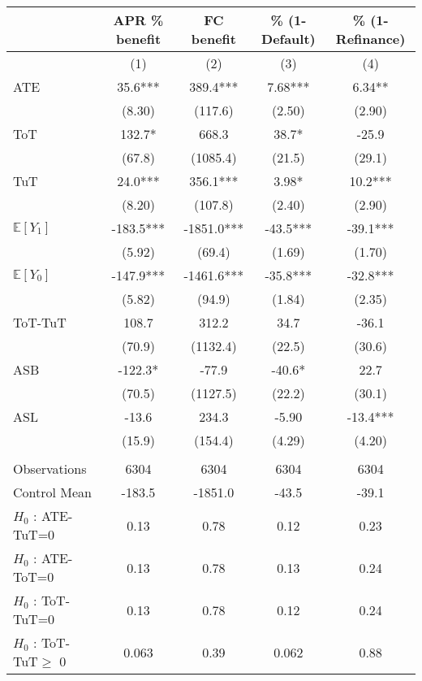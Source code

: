 \begin{tabular}{lcccc}
\toprule
      & APR \% benefit & FC benefit & \% (1-Default) & \% (1-Refinance) \\
\midrule
      & (1)   & (2)   & (3)   & (4) \\
\midrule
\midrule
ATE   & 35.6*** & 389.4*** & 7.68*** & 6.34** \\
      & (8.30) & (117.6) & (2.50) & (2.90) \\
ToT   & 132.7* & 668.3 & 38.7* & -25.9 \\
      & (67.8) & (1085.4) & (21.5) & (29.1) \\
TuT   & 24.0*** & 356.1*** & 3.98* & 10.2*** \\
      & (8.20) & (107.8) & (2.40) & (2.90) \\
$\mathbb{E}[Y_1]$ & -183.5*** & -1851.0*** & -43.5*** & -39.1*** \\
      & (5.92) & (69.4) & (1.69) & (1.70) \\
$\mathbb{E}[Y_0]$ & -147.9*** & -1461.6*** & -35.8*** & -32.8*** \\
      & (5.82) & (94.9) & (1.84) & (2.35) \\
\midrule
ToT-TuT & 108.7 & 312.2 & 34.7  & -36.1 \\
      & (70.9) & (1132.4) & (22.5) & (30.6) \\
ASB   & -122.3* & -77.9 & -40.6* & 22.7 \\
      & (70.5) & (1127.5) & (22.2) & (30.1) \\
ASL   & -13.6 & 234.3 & -5.90 & -13.4*** \\
      & (15.9) & (154.4) & (4.29) & (4.20) \\
      &       &       &       &  \\
\midrule
Observations & 6304  & 6304  & 6304  & 6304 \\
Control Mean & -183.5 & -1851.0 & -43.5 & -39.1 \\
$H_0$ : ATE-TuT=0 & 0.13  & 0.78  & 0.12  & 0.23 \\
$H_0$ : ATE-ToT=0 & 0.13  & 0.78  & 0.13  & 0.24 \\
$H_0$ : ToT-TuT=0 & 0.13  & 0.78  & 0.12  & 0.24 \\
$H_0$ : ToT-TuT$\geq$ 0 & 0.063 & 0.39  & 0.062 & 0.88 \\
\bottomrule
\bottomrule
\end{tabular}%
